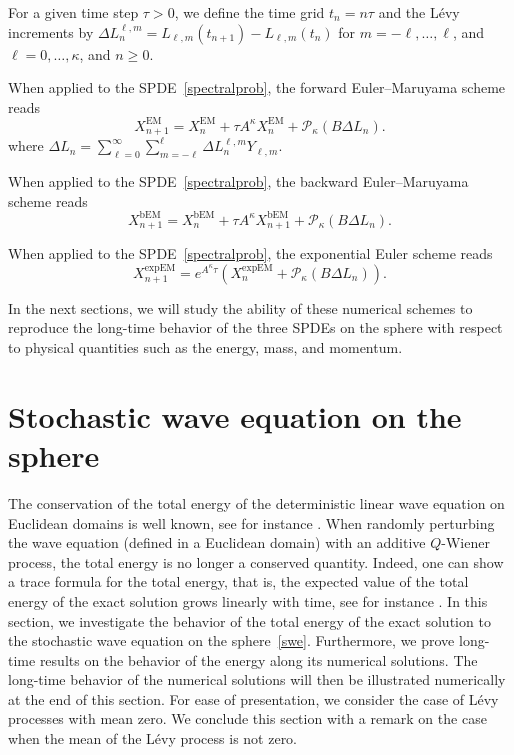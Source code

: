 \documentclass[11pt]{amsart}
\newcommand{\cP}{\mathcal{P}}
\begin{document}
For a given time step $\tau > 0$, we define the time grid $t_n=n\tau$ and the L\'evy increments
by $\Delta L^{\ell, m}_n=L_{\ell,m}(t_{n+1})-L_{\ell,m}(t_{n})$ for $m=-\ell,\ldots,\ell$,
and $\ell=0,\ldots,\kappa$, and $n\geq 0$.

When applied to the SPDE~\eqref{spectralprob}, the forward Euler--Maruyama scheme reads
\begin{equation}\label{eEM}
X^{\text{EM}}_{n+1}=X^{\text{EM}}_{n}+\tau A^\kappa X^{\text{EM}}_{n}+\cP_\kappa\left(B\Delta L_n\right).
\end{equation}
where $\Delta L_n= \displaystyle \sum_{\ell=0}^{\infty}\sum_{m = - \ell}^{\ell} \Delta L^{\ell, m}_n Y_{\ell , m}$.

When applied to the SPDE~\eqref{spectralprob}, the backward Euler--Maruyama scheme reads
\begin{equation}\label{bEM}
X^{\text{bEM}}_{n+1}=X^{\text{bEM}}_{n}+\tau A^\kappa X^{\text{bEM}}_{n+1}+\cP_\kappa\left(B\Delta L_n\right).
\end{equation}

When applied to the SPDE~\eqref{spectralprob}, the exponential Euler scheme reads
\begin{equation}\label{expEM}
X^{\text{expEM}}_{n+1}=e^{A^\kappa\tau}\left(X^{\text{expEM}}_{n}+\cP_\kappa\left(B\Delta L_n\right)\right).
\end{equation}

In the next sections, we will study the ability of these numerical schemes to reproduce the long-time behavior of
the three SPDEs on the sphere with respect to physical quantities such as the energy, mass, and momentum.

\section{Stochastic wave equation on the sphere}\label{sect-swe}
The conservation of the total energy of the deterministic linear wave equation on Euclidean domains is well known,
see for instance \cite[Section 2.4.3]{MR2597943}. When randomly perturbing the wave equation
(defined in a Euclidean domain) with an additive $Q$-Wiener process, the total energy is no longer a conserved quantity.
Indeed, one can show a trace formula for the total energy, that is, the expected value of the total energy of the exact solution grows linearly with time,
see for instance \cite{MR3033008,MR3012932}. In this section, we investigate the behavior of the total energy of the exact solution to the stochastic wave equation on the sphere~\eqref{swe}. Furthermore, we prove long-time results on the behavior of the energy along its numerical solutions.
The long-time behavior of the numerical solutions will then be illustrated numerically at the end of this section.
For ease of presentation, we consider the case of L\'evy processes with mean zero.
We conclude this section with a remark on the case when the mean of the L\'evy process is not zero.
\end{document}
